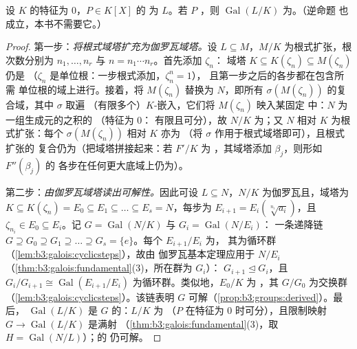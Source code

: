 \begin{theorem}[伽罗瓦]\label{thm:b3:galois:solvable}
设 $K$ 的特征为 $0$，$P \in K[X]$ 的
为 $L$。若 $P$ ，则
$\operatorname{Gal}(L/K)$ 为。（逆命题
也成立，本书不需要它。）
\end{theorem}

\begin{proof}
第一步：\emph{将根式域塔扩充为伽罗瓦域塔。}设 $L
\subseteq M$，$M/K$ 为根式扩张，根次数分别为 $n_1, \dots,
n_r$ 与 $n = n_1\cdots n_r$。首先添加 $\zeta_n$：
域塔 $K \subseteq K(\zeta_n) \subseteq M(\zeta_n)$ 仍是
（$\zeta_n$ 是单位根：一步根式添加，$\zeta_n^n = 1$），
且第一步之后的各步都在包含所需
单位根的域上进行。接着，将 $M(\zeta_n)$ 替换为
$N$，即所有 $\sigma(M(\zeta_n))$ 的复合域，其中 $\sigma$ 取遍
（有限多个）$K$-嵌入，它们将 $M(\zeta_n)$ 映入某固定
中：$N$ 为一组生成元的之积的
（特征为 $0$：
有限且可分），故 $N/K$ 为；又 $N$
相对 $K$ 为根式扩张：每个 $\sigma(M(\zeta_n))$ 相对 $K$ 亦为
（将 $\sigma$ 作用于根式域塔即可），且根式扩张的
复合仍为（把域塔拼接起来：若 $F'/K$ 为
，其域塔添加 $\beta_j$，则形如 $F''(\beta_j)$ 的
各步在任何更大底域上仍为）。

第二步：\emph{由伽罗瓦域塔读出可解性。}因此可设
$L \subseteq N$，$N/K$ 为伽罗瓦且，域塔为 $K
\subseteq K(\zeta_n) = E_0 \subseteq E_1 \subseteq \dots
\subseteq E_s = N$，每步为 $E_{i+1} = E_i(\sqrt[n_i]{a_i})$，且
$\zeta_{n_i} \in E_0 \subseteq E_i$。记 $G =
\operatorname{Gal}(N/K)$ 与 $G_i = \operatorname{Gal}(N/E_i)$：
一条递降链 $G \supseteq G_0 \supseteq G_1 \supseteq
\dots \supseteq G_s = \{e\}$。每个 $E_{i+1}/E_i$ 为，
其为循环群（\cref{lem:b3:galois:cyclicsteps}），故由
伽罗瓦基本定理应用于 $N/E_i$
（\cref{thm:b3:galois:fundamental}(3)，所在群为 $G_i$）：
$G_{i+1} \trianglelefteq G_i$，且 $G_i/G_{i+1} \cong
\operatorname{Gal}(E_{i+1}/E_i)$ 为循环群。类似地，$E_0/K$ 为
，其 $G/G_0$ 为交换群
（\cref{lem:b3:galois:cyclicsteps}）。该链表明 $G$
可解（\cref{prop:b3:groups:derived}）。最后，
$\operatorname{Gal}(L/K)$ 是 $G$ 的\emph{}：$L/K$ 为
（$P$ 在特征为 $0$ 时可分），且限制映射 $G
\to \operatorname{Gal}(L/K)$ 是满射
（\cref{thm:b3:galois:fundamental}(3)，取 $H =
\operatorname{Gal}(N/L)$）；的
仍可解。
\end{proof}

